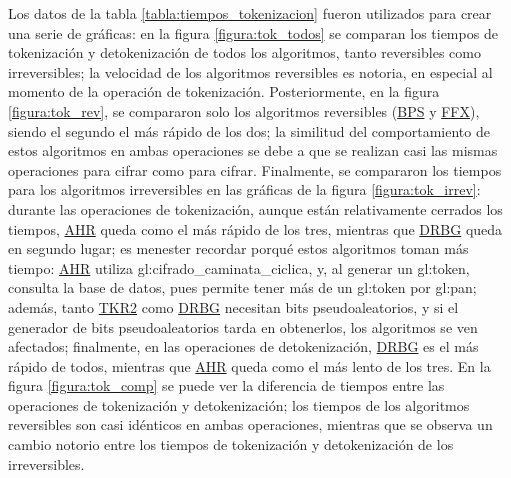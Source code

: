 Los datos de la tabla \ref{tabla:tiempos_tokenizacion} fueron utilizados para
crear una serie de gráficas: en la figura \ref{figura:tok_todos} se comparan los
tiempos de tokenización y detokenización de todos los algoritmos, tanto
reversibles como irreversibles; la velocidad de los algoritmos reversibles es
notoria, en especial al momento de la operación de tokenización. Posteriormente,
en la figura \ref{figura:tok_rev}, se compararon solo los algoritmos reversibles
(\hyperref[sec:bps]{BPS} y \hyperref[sec:ffx]{FFX}), siendo el segundo el más
rápido de los dos; la similitud del comportamiento de estos algoritmos en ambas
operaciones se debe a que se realizan casi las mismas operaciones para cifrar
como para cifrar. Finalmente, se compararon los tiempos para los algoritmos
irreversibles en las gráficas de la figura \ref{figura:tok_irrev}: durante las
operaciones de tokenización, aunque están relativamente cerrados los tiempos,
\hyperref[sec:ahr]{AHR} queda como el más rápido de los tres, mientras que
\hyperref[sec:drbg_lista]{DRBG} queda en segundo lugar; es menester recordar
porqué estos algoritmos toman más tiempo: \hyperref[sec:ahr]{AHR} utiliza
\gls{gl:cifrado_caminata_ciclica}, y, al generar un \gls{gl:token}, consulta la
base de datos, pues permite tener más de un \gls{gl:token} por \gls{gl:pan};
además, tanto \hyperref[sec:tkr]{TKR2} como \hyperref[sec:drbg_lista]{DRBG}
necesitan bits pseudoaleatorios, y si el generador de bits pseudoaleatorios
tarda en obtenerlos, los algoritmos se ven afectados; finalmente, en las
operaciones de detokenización, \hyperref[sec:drbg_lista]{DRBG} es el más rápido
de todos, mientras que \hyperref[sec:ahr]{AHR} queda como el más lento de los
tres. En la figura \ref{figura:tok_comp} se puede ver la diferencia de tiempos
entre las operaciones de tokenización y detokenización; los tiempos de los
algoritmos reversibles son casi idénticos en ambas operaciones, mientras que
se observa un cambio notorio entre los tiempos de tokenización y detokenización
de los irreversibles.

